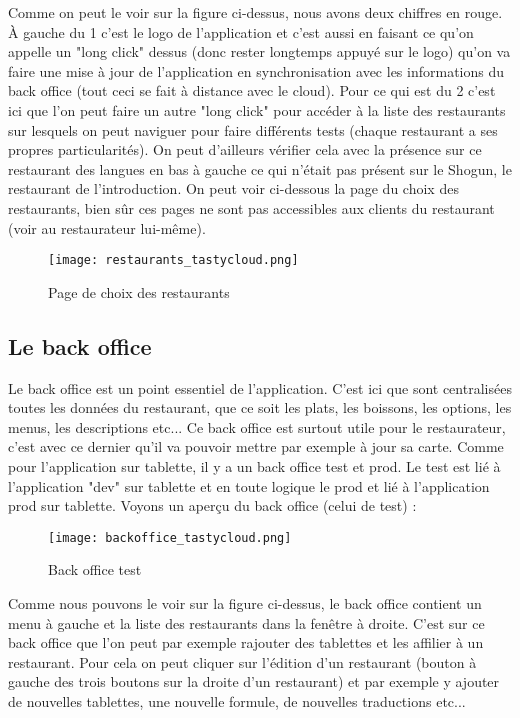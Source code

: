 Comme on peut le voir sur la figure ci-dessus, nous avons deux chiffres en rouge. À gauche du 1 c'est le logo de l'application et c'est aussi en faisant ce qu'on appelle un "long click" dessus (donc rester longtemps appuyé sur le logo) qu'on va faire une mise à jour de l'application en synchronisation avec les informations du back office (tout ceci se fait à distance avec le cloud). Pour ce qui est du 2 c'est ici que l'on peut faire un autre "long click" pour accéder à la liste des restaurants sur lesquels on peut naviguer pour faire différents tests (chaque restaurant a ses propres particularités). On peut d'ailleurs vérifier cela avec la présence sur ce restaurant des langues en bas à gauche ce qui n'était pas présent sur le Shogun, le restaurant de l'introduction. On peut voir ci-dessous la page du choix des restaurants, bien sûr ces pages ne sont pas accessibles aux clients du restaurant (voir au restaurateur lui-même).

\begin{figure}[!htb]
  \centering
  \texttt{[image: restaurants\_tastycloud.png]}
  \caption{Page de choix des restaurants}
  \label{fig:boat1}
\end{figure}


\clearpage
\subsection{Le back office}

Le back office est un point essentiel de l'application. C'est ici que sont centralisées toutes les données du restaurant, que ce soit les plats, les boissons, les options, les menus, les descriptions etc... Ce back office est surtout utile pour le restaurateur, c'est avec ce dernier qu'il va pouvoir mettre par exemple à jour sa carte. Comme pour l'application sur tablette, il y a un back office test et prod. Le test est lié à l'application "dev" sur tablette et en toute logique le prod et lié à l'application prod sur tablette. Voyons un aperçu du back office (celui de test) :

\begin{figure}[!htb]
  \centering
  \texttt{[image: backoffice\_tastycloud.png]}
  \caption{Back office test}
  \label{fig:boat1}
\end{figure}

Comme nous pouvons le voir sur la figure ci-dessus, le back office contient un menu à gauche et la liste des restaurants dans la fenêtre à droite. C'est sur ce back office que l'on peut par exemple rajouter des tablettes et les affilier à un restaurant. Pour cela on peut cliquer sur l'édition d'un restaurant (bouton à gauche des trois boutons sur la droite d'un restaurant) et par exemple y ajouter de nouvelles tablettes, une nouvelle formule, de nouvelles traductions etc...

